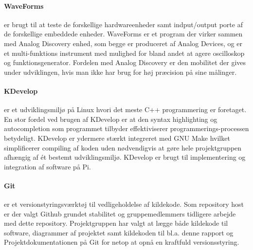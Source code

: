 \paragraph{WaveForms} er brugt til at teste de forskellige hardwareenheder samt indput/output porte af de forskellige embeddede enheder. WaveForms er et program der virker sammen med Analog Discovery enhed, som begge er produceret af Analog Devices, og er et multi-funktions instrument med mulighed for bland andet at agere oscilloskop og funktionsgenerator. Fordelen med Analog Discovery er den mobilitet der gives under udviklingen, hvis man ikke har brug for høj præcision på sine målinger.

\paragraph{KDevelop} er et udviklingsmiljø på Linux hvori det meste C++ programmering er foretaget. En stor fordel ved brugen af KDevelop er at den syntax highlighting og autocompletion som programmet tilbyder effektiviserer programmerings-processen betydeligt. KDevelop er ydermere stærkt integreret med GNU Make\cite{lib:GNU_make} hvilket simplificerer compiling af koden uden nødvendigvis at gøre hele projektgruppen afhængig af ét bestemt udviklingsmiljø. KDevelop er brugt til implementering og integration af software på Pi.

\paragraph{Git} er et versionstyringsværktøj til vedligeholdelse af kildekode. Som repository host er der valgt Github grundet stabilitet og gruppemedlemmers tidligere arbejde med dette repository. Projektgruppen har valgt at lægge både kildekode til software, diagrammer af projektet samt kildekoden til bl.a. denne rapport og Projektdokumentationen på Git for netop at opnå en kraftfuld versionsstyring\cite{lib:au2_git}.
